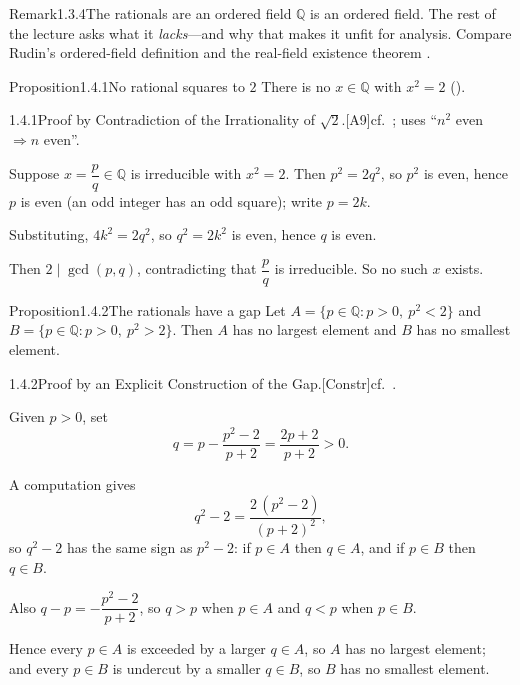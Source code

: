 \documentclass[main.tex]{subfiles}
\begin{document}
\begin{ObjL}{Remark}{1.3.4}{The rationals are an ordered field}
$\mathbb Q$ is an ordered field. The rest of the lecture asks what it \emph{lacks}---and why that
makes it unfit for analysis. Compare Rudin's ordered-field definition  and the real-field
existence theorem .
\end{ObjL}


\begin{Obj}{Proposition}{1.4.1}{No rational squares to $2$}
There is no $x\in\mathbb Q$ with $x^2=2$ ().
\end{Obj}
\begin{Prf}{1.4.1}{Proof by Contradiction of the Irrationality of $\sqrt2$.}{[A9]\quad cf.\ ; uses ``$n^2$ even $\Rightarrow n$ even''.}
\item Suppose $x=\dfrac pq\in\mathbb Q$ is irreducible with $x^2=2$. Then $p^2=2q^2$, so $p^2$ is
  even, hence $p$ is even (an odd integer has an odd square); write $p=2k$.
\item Substituting, $4k^2=2q^2$, so $q^2=2k^2$ is even, hence $q$ is even.
\item Then $2\mid\gcd(p,q)$, contradicting that $\dfrac pq$ is irreducible. So no such $x$ exists.
\end{Prf}

\begin{Obj}{Proposition}{1.4.2}{The rationals have a gap}
Let $A=\{p\in\mathbb Q : p>0,\ p^2<2\}$ and $B=\{p\in\mathbb Q : p>0,\ p^2>2\}$. Then $A$ has no
largest element and $B$ has no smallest element.
\end{Obj}
\begin{Prf}{1.4.2}{Proof by an Explicit Construction of the Gap.}{[Constr]\quad cf.\ .}
\item Given $p>0$, set
  \[ q=p-\frac{p^2-2}{p+2}=\frac{2p+2}{p+2}>0 . \]
\item A computation gives
  \[ q^2-2=\frac{2\,(p^2-2)}{(p+2)^2}, \]
  so $q^2-2$ has the same sign as $p^2-2$: if $p\in A$ then $q\in A$, and if $p\in B$ then $q\in B$.
\item Also $q-p=-\dfrac{p^2-2}{p+2}$, so $q>p$ when $p\in A$ and $q<p$ when $p\in B$.
\item Hence every $p\in A$ is exceeded by a larger $q\in A$, so $A$ has no largest element; and
  every $p\in B$ is undercut by a smaller $q\in B$, so $B$ has no smallest element.
\end{Prf}
\end{document}
